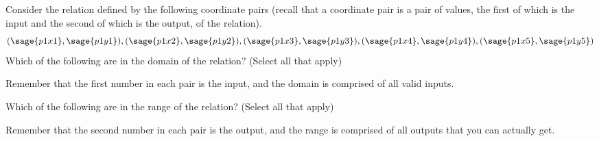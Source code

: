 \documentclass{ximera}
\begin{document}
\begin{problem}
    Consider the relation defined by the following coordinate pairs (recall that a coordinate pair is a pair of values, the first of which is the input and the second of which is the output, of the relation).
    \[
        (\sage{p1x1},\sage{p1y1}),(\sage{p1x2},\sage{p1y2}),(\sage{p1x3},\sage{p1y3}),(\sage{p1x4},\sage{p1y4}),(\sage{p1x5},\sage{p1y5})
    \]
    Which of the following are in the domain of the relation? (Select all that apply)
    \begin{selectAll}
    \end{selectAll}
    \begin{feedback}
        Remember that the first number in each pair is the input, and the domain is comprised of all valid inputs.
    \end{feedback}
    \begin{problem}
        Which of the following are in the range of the relation? (Select all that apply)
        \begin{selectAll}
        \end{selectAll}
        \begin{feedback}
            Remember that the second number in each pair is the output, and the range is comprised of all outputs that you can actually get.
        \end{feedback}
    \end{problem}
\end{problem}
\end{document}
